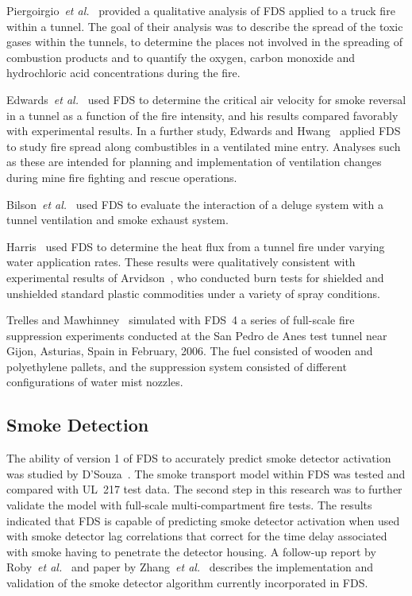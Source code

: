 Piergoirgio~{\em  et al.}~\cite{Piergiorgio:1} provided  a qualitative analysis of FDS applied to a  truck fire within a tunnel.  The goal of their
analysis  was to describe the  spread of the  toxic gases within the tunnels, to determine the  places not involved in the spreading of combustion
products  and to quantify  the oxygen, carbon  monoxide and hydrochloric acid concentrations during the fire.

Edwards~{\em  et al.}~\cite{Edwards:SME2005,Edwards:FSJ}  used  FDS to determine the critical air velocity  for smoke reversal in a tunnel as a
function of  the fire intensity, and his  results compared favorably with   experimental  results.   In  a   further  study,   Edwards  and
Hwang~\cite{Edwards:SME2006}  applied FDS to  study fire  spread along combustibles in  a ventilated mine  entry. Analyses such as  these are
intended for planning and implementation of ventilation changes during mine fire fighting and rescue operations.

Bilson~{\em et al.}~\cite{Bilson:2008} used FDS to evaluate the interaction of a deluge system with a tunnel
ventilation and smoke exhaust system.

Harris~\cite{Harris:ISTSS2010} used FDS to determine the heat flux from a tunnel fire under varying water application rates.
These results were qualitatively consistent with experimental results of Arvidson~\cite{Arvidson:ISTSS2010}, who conducted burn tests for shielded and unshielded
standard plastic commodities under a variety of spray conditions.

Trelles and Mawhinney~\cite{Trelles:JFPE2010} simulated with FDS~4 a series of full-scale fire suppression experiments conducted at the
San Pedro de Anes test tunnel near Gijon, Asturias, Spain in February, 2006. The fuel consisted of wooden and polyethylene pallets, and the suppression system
consisted of different configurations of water mist nozzles.




\subsection{Smoke Detection}

The ability of  version 1 of FDS to  accurately predict smoke detector activation was studied by D'Souza~\cite{DSouza:1}. The smoke transport model
within FDS  was tested and compared with UL~217 test data.  The second step  in this research was  to further validate  the model with full-scale
multi-compartment fire tests.  The results  indicated that FDS is capable of predicting  smoke detector activation when used with smoke  detector
lag correlations  that  correct  for  the time  delay associated with smoke having to penetrate the detector housing. A follow-up report by
Roby~{\em et al.}~\cite{CSE_GCR} and paper by
Zhang~{\em et al.}~\cite{Zhang:FSJ2008} describes the implementation and validation of the smoke detector algorithm currently incorporated in FDS.

